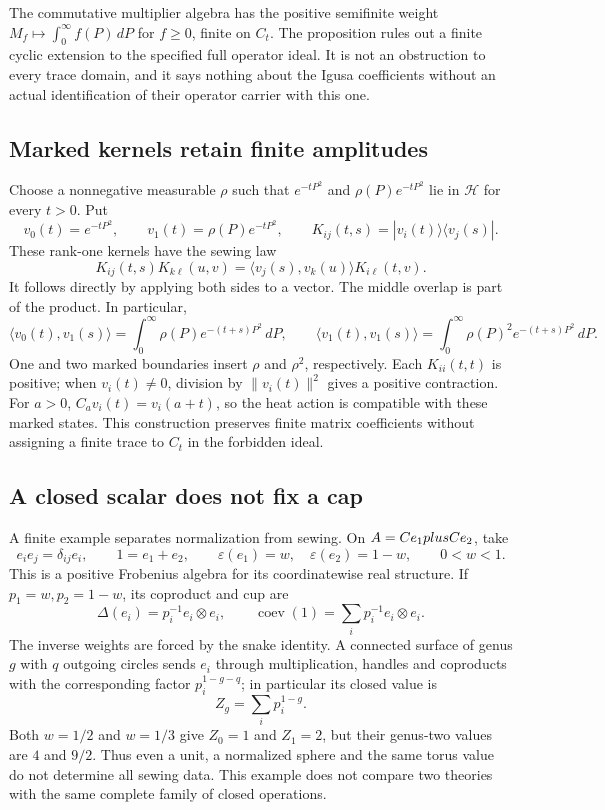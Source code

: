 The commutative multiplier algebra has the positive semifinite
weight \(M_f\mapsto\int_0^\infty f(P)\,dP\) for \(f\ge0\),
finite on \(C_t\).  The proposition rules out a finite cyclic extension
to the specified full operator ideal.  It is not an obstruction
to every trace domain, and it says nothing about the Igusa
coefficients without an actual identification of their operator
carrier with this one.

\subsection{Marked kernels retain finite amplitudes}
\label{subsec:zbps-marked-kernels}

Choose a nonnegative measurable \(\rho\) such that
\(e^{-tP^2}\) and \(\rho(P)e^{-tP^2}\) lie in \(\mathcal H\)
for every \(t>0\).  Put
\[
 v_0(t)=e^{-tP^2},\qquad v_1(t)=\rho(P)e^{-tP^2},\qquad
 K_{ij}(t,s)=|v_i(t)\rangle\langle v_j(s)|.
\]
These rank-one kernels have the sewing law
\[
 K_{ij}(t,s)K_{k\ell}(u,v)
 =\langle v_j(s),v_k(u)\rangle K_{i\ell}(t,v).
\]
It follows directly by applying both sides to a vector.
The middle overlap is part of the product.  In particular,
\[
 \langle v_0(t),v_1(s)\rangle
   =\int_0^\infty\rho(P)e^{-(t+s)P^2}\,dP,
 \qquad
 \langle v_1(t),v_1(s)\rangle
   =\int_0^\infty\rho(P)^2e^{-(t+s)P^2}\,dP.
\]
One and two marked boundaries insert \(\rho\) and \(\rho^2\),
respectively.  Each \(K_{ii}(t,t)\) is positive; when
\(v_i(t)\ne0\), division by \(\|v_i(t)\|^2\) gives a positive
contraction.  For \(a>0\), \(C_a v_i(t)=v_i(a+t)\), so the heat action is compatible
with these marked states.  This construction preserves finite
matrix coefficients without assigning a finite trace to \(C_t\)
in the forbidden ideal.

\subsection{A closed scalar does not fix a cap}
\label{subsec:zbps-frobenius-sewing}

A finite example separates normalization from sewing.  On
\(A=C e_1plusC e_2\), take
\[
 e_ie_j=\delta_{ij}e_i,\qquad 1=e_1+e_2,
 \qquad \varepsilon(e_1)=w,\quad\varepsilon(e_2)=1-w,
 \qquad 0<w<1.
\]
This is a positive Frobenius algebra for its coordinatewise real
structure.  If \(p_1=w,p_2=1-w\), its coproduct and cup are
\[
 \Delta(e_i)=p_i^{-1}e_i\otimes e_i,
 \qquad \operatorname{coev}(1)=\sum_i p_i^{-1}e_i\otimes e_i.
\]
The inverse weights are forced by the snake identity.
A connected surface of genus \(g\) with \(q\) outgoing circles
sends \(e_i\) through multiplication, handles and coproducts with
the corresponding factor \(p_i^{1-g-q}\); in particular its
closed value is
\[
 Z_g=\sum_i p_i^{1-g}.
\]
Both \(w=1/2\) and \(w=1/3\) give \(Z_0=1\) and \(Z_1=2\),
but their genus-two values are \(4\) and \(9/2\).
Thus even a unit, a normalized sphere and the same torus value
do not determine all sewing data.  This example does not compare
two theories with the same complete family of closed operations.

